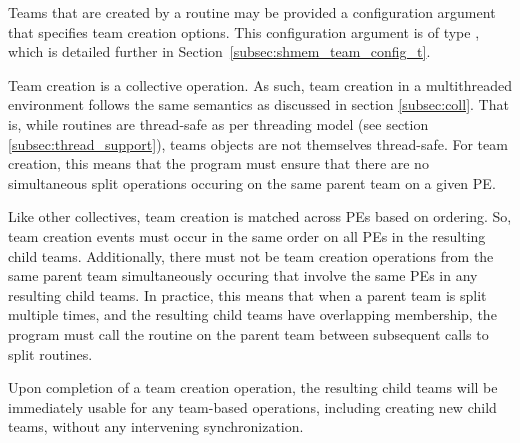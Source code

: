 Teams that are created by a  routine may be
provided a configuration argument that specifies team creation options.
This configuration argument is of type , which
is detailed further in Section~\ref{subsec:shmem_team_config_t}.

Team creation is a collective operation. As such, team creation in a
multithreaded environment follows the same semantics as discussed in section
\ref{subsec:coll}. That is, while \openshmem routines are thread-safe as
per threading model (see section \ref{subsec:thread_support}),\openshmem
teams objects are not themselves thread-safe. For team creation, this means
that the program must ensure that there are no simultaneous split operations
occuring on the same parent team on a given \ac{PE}.

Like other collectives, team creation is matched across PEs based
on ordering. So, team creation events must occur in the same order on all \acp{PE}
in the resulting child teams. Additionally, there must not be team creation
operations from the same parent team simultaneously occuring that involve
the same \acp{PE} in any resulting child teams. In practice, this means that when a parent team
is split multiple times, and the resulting child teams have overlapping membership,
the program must call the  routine on the parent team
between subsequent calls to split routines.

Upon completion of a team creation operation, the resulting child teams will be
immediately usable for any team-based operations, including creating new child teams,
without any intervening synchronization.
